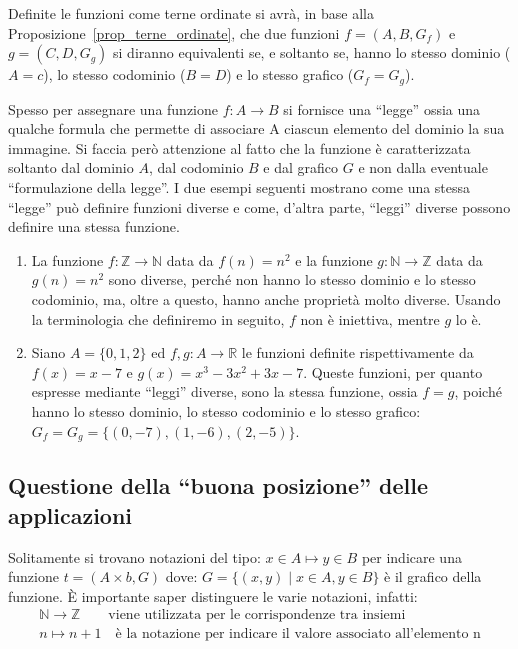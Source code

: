 \begin{osservation}
	Definite le funzioni come terne ordinate si avrà, in base alla Proposizione~\ref{prop_terne_ordinate}, che due funzioni $f=(A,B,G_{f})$ e $g=(C,D,G_{g})$ si diranno equivalenti se, e soltanto se, hanno lo stesso dominio ($A=c$), lo stesso codominio ($B=D$) e lo stesso grafico ($G_{f}=G_{g}$).
\end{osservation}

Spesso per assegnare una funzione $ f\colon A \longrightarrow B$ si fornisce una ``legge'' ossia una qualche formula che permette di associare A ciascun elemento del dominio la sua immagine. Si faccia però attenzione al fatto che la funzione è caratterizzata soltanto dal dominio $A$, dal codominio $B$ e dal grafico $G$ e non dalla eventuale “formulazione della legge”. I due esempi seguenti mostrano come una stessa “legge” può definire funzioni diverse e come, d’altra parte, “leggi” diverse possono definire una stessa funzione.

\begin{example}
\begin{enumerate}
	\item La funzione $f\colon \mathbb{Z}\longrightarrow \mathbb {N}$ data da $f(n)=n^2$ e la funzione $g\colon \mathbb {N} \longrightarrow \mathbb {Z}$
	data da $g(n)=n^2$ sono diverse, perché non hanno lo stesso dominio e lo stesso	codominio, ma, oltre a questo, hanno anche proprietà molto diverse. Usando la terminologia che definiremo in seguito, $f$ non è iniettiva, mentre $g$ lo è.

	\item Siano $A=\{0,1,2\}$ ed $f,g: A \longrightarrow \mathbb{R}$ le funzioni definite rispettivamente da $f(x)=x-7$ e $g(x)=x^3-3x^2+3x-7$. Queste funzioni, per quanto espresse mediante ``leggi'' diverse, sono la stessa funzione, ossia $f=g$, poiché hanno lo stesso dominio, lo stesso codominio e lo stesso grafico: $G_{f} = G_{g} = \{(0,-7),(1,-6),(2,-5)\}$.
\end{enumerate}
\end{example}

\subsection{Questione della ``buona posizione'' delle applicazioni}
Solitamente si trovano notazioni del tipo: $x \in A \mapsto y \in B$
per indicare una funzione $t=(A \times b, G)$ dove: $G=\{(x,y) \; | \; x \in A, y \in B \}$ è il grafico della funzione. È importante saper distinguere le varie notazioni, infatti:
\[
\begin{array}{lc}
	\mathbb{N} \rightarrow \mathbb{Z} \qquad \mbox{viene utilizzata per le corrispondenze tra insiemi} \\
	n \mapsto n+1 \quad \mbox{è la notazione per indicare il valore associato all'elemento n}          \\
\end{array}
\]

